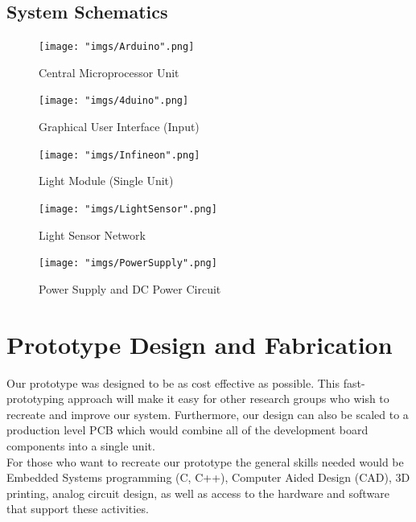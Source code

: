 \documentclass[12pt,a4paper]{report}
\begin{document}
\subsection{System Schematics}
\begin{figure}[H]
	\centering
	\texttt{[image: "imgs/Arduino".png]}\par			\vspace{0.1cm}
	\caption{Central Microprocessor Unit}
\end{figure}
\newpage
\begin{figure}[H]
	\centering
	\texttt{[image: "imgs/4duino".png]}\par			\vspace{0.1cm}
	\caption{Graphical User Interface (Input)}
\end{figure}
\newpage
\begin{figure}[H]
	\centering
	\texttt{[image: "imgs/Infineon".png]}\par			\vspace{0.1cm}
	\caption{Light Module (Single Unit)}
\end{figure}
\newpage
\begin{figure}[H]
	\centering
	\texttt{[image: "imgs/LightSensor".png]}\par			\vspace{0.1cm}
	\caption{Light Sensor Network}
\end{figure}
\newpage
\begin{figure}[H]
	\centering
	\texttt{[image: "imgs/PowerSupply".png]}\par			\vspace{0.1cm}
	\caption{Power Supply and DC Power Circuit}
\end{figure}
\newpage

\section{Prototype Design and Fabrication}
Our prototype was designed to be as cost effective as possible. This fast-prototyping approach will make it easy for other research groups who wish to recreate and improve our system. Furthermore, our design can also be scaled to a production level PCB which would combine all of the development board components into a single unit. \\
\linebreak
For those who want to recreate our prototype the general skills needed would be Embedded Systems programming (C, C++), Computer Aided Design (CAD), 3D printing, analog circuit design, as well as access to the hardware and software that support these activities. 
\end{document}
